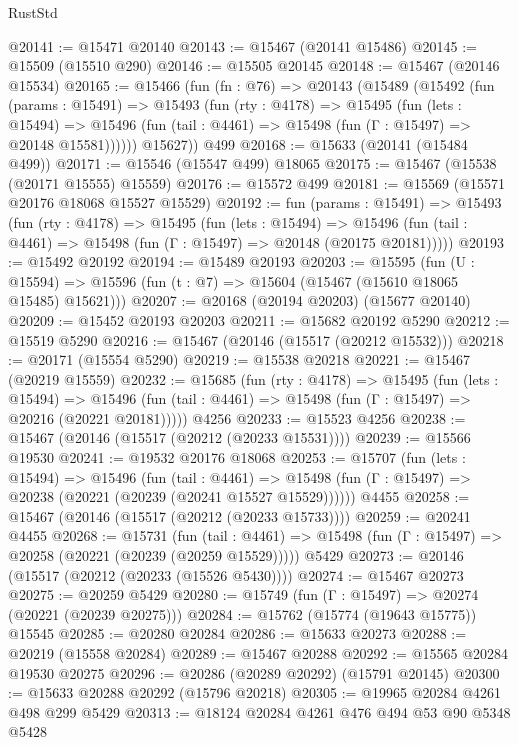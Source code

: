\begin{lexlean}{RustStd}
\begin{coremodule}
@20141 := @15471 @20140
@20143 := @15467 (@20141 @15486)
@20145 := @15509 (@15510 @290)
@20146 := @15505 @20145
@20148 := @15467 (@20146 @15534)
@20165 := @15466
    (fun (fn : @76) =>
    @20143
      (@15489
        (@15492
          (fun (params : @15491) =>
          @15493
            (fun (rty : @4178) =>
            @15495
              (fun (lets : @15494) =>
              @15496 (fun (tail : @4461) => @15498 (fun (Γ : @15497) => @20148 @15581))))))
        @15627))
    @499
@20168 := @15633 (@20141 (@15484 @499))
@20171 := @15546 (@15547 @499) @18065
@20175 := @15467 (@15538 (@20171 @15555) @15559)
@20176 := @15572 @499
@20181 := @15569 (@15571 @20176 @18068 @15527 @15529)
@20192 := fun (params : @15491) =>
  @15493
    (fun (rty : @4178) =>
    @15495
      (fun (lets : @15494) =>
      @15496 (fun (tail : @4461) => @15498 (fun (Γ : @15497) => @20148 (@20175 @20181)))))
@20193 := @15492 @20192
@20194 := @15489 @20193
@20203 := @15595
    (fun (U : @15594) => @15596 (fun (t : @7) => @15604 (@15467 (@15610 @18065 @15485) @15621)))
@20207 := @20168 (@20194 @20203) (@15677 @20140)
@20209 := @15452 @20193 @20203
@20211 := @15682 @20192 @5290
@20212 := @15519 @5290
@20216 := @15467 (@20146 (@15517 (@20212 @15532)))
@20218 := @20171 (@15554 @5290)
@20219 := @15538 @20218
@20221 := @15467 (@20219 @15559)
@20232 := @15685
    (fun (rty : @4178) =>
    @15495
      (fun (lets : @15494) =>
      @15496 (fun (tail : @4461) => @15498 (fun (Γ : @15497) => @20216 (@20221 @20181)))))
    @4256
@20233 := @15523 @4256
@20238 := @15467 (@20146 (@15517 (@20212 (@20233 @15531))))
@20239 := @15566 @19530
@20241 := @19532 @20176 @18068
@20253 := @15707
    (fun (lets : @15494) =>
    @15496
      (fun (tail : @4461) =>
      @15498 (fun (Γ : @15497) => @20238 (@20221 (@20239 (@20241 @15527 @15529))))))
    @4455
@20258 := @15467 (@20146 (@15517 (@20212 (@20233 @15733))))
@20259 := @20241 @4455
@20268 := @15731
    (fun (tail : @4461) => @15498 (fun (Γ : @15497) => @20258 (@20221 (@20239 (@20259 @15529)))))
    @5429
@20273 := @20146 (@15517 (@20212 (@20233 (@15526 @5430))))
@20274 := @15467 @20273
@20275 := @20259 @5429
@20280 := @15749 (fun (Γ : @15497) => @20274 (@20221 (@20239 @20275)))
@20284 := @15762 (@15774 (@19643 @15775)) @15545
@20285 := @20280 @20284
@20286 := @15633 @20273
@20288 := @20219 (@15558 @20284)
@20289 := @15467 @20288
@20292 := @15565 @20284 @19530 @20275
@20296 := @20286 (@20289 @20292) (@15791 @20145)
@20300 := @15633 @20288 @20292 (@15796 @20218)
@20305 := @19965 @20284 @4261 @498 @299 @5429
@20313 := @18124 @20284 @4261 @476 @494 @53 @90 @5348 @5428

\end{coremodule}
\end{lexlean}
